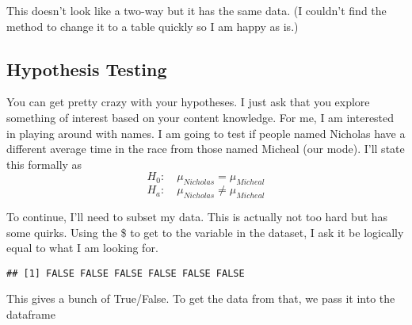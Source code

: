 \documentclass[
]{article}
\newenvironment{Shaded}{\begin{snugshade}}{\end{snugshade}}
\newcommand{\CommentTok}[1]{\textcolor[rgb]{0.56,0.35,0.01}{\textit{#1}}}
\newcommand{\FunctionTok}[1]{\textcolor[rgb]{0.13,0.29,0.53}{\textbf{#1}}}
\newcommand{\NormalTok}[1]{#1}
\newcommand{\SpecialCharTok}[1]{\textcolor[rgb]{0.81,0.36,0.00}{\textbf{#1}}}
\newcommand{\StringTok}[1]{\textcolor[rgb]{0.31,0.60,0.02}{#1}}
\begin{document}
This doesn't look like a two-way but it has the same data. (I couldn't
find the method to change it to a table quickly so I am happy as is.)

\subsection{Hypothesis Testing}\label{hypothesis-testing}

You can get pretty crazy with your hypotheses. I just ask that you
explore something of interest based on your content knowledge. For me, I
am interested in playing around with names. I am going to test if people
named Nicholas have a different average time in the race from those
named Micheal (our mode). I'll state this formally as \[
H_0:\quad \mu_{Nicholas} = \mu_{Micheal}
\] \[
H_a:\quad \mu_{Nicholas} \neq \mu_{Micheal}
\]

To continue, I'll need to subset my data. This is actually not too hard
but has some quirks. Using the \$ to get to the variable in the dataset,
I ask it be logically equal to what I am looking for.

\begin{Shaded}
\end{Shaded}

\begin{verbatim}
## [1] FALSE FALSE FALSE FALSE FALSE FALSE
\end{verbatim}

This gives a bunch of True/False. To get the data from that, we pass it
into the dataframe

\begin{Shaded}
\end{Shaded}
\end{document}
